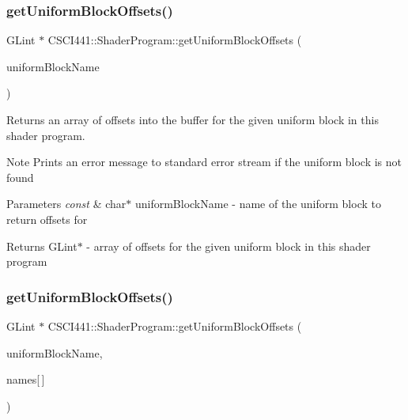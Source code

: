 \subsubsection{\texorpdfstring{get\+Uniform\+Block\+Offsets()}{getUniformBlockOffsets()}\hspace{0.1cm}{\footnotesize\ttfamily [1/2]}}
{\footnotesize\ttfamily G\+Lint $\ast$ C\+S\+C\+I441\+::\+Shader\+Program\+::get\+Uniform\+Block\+Offsets (\begin{DoxyParamCaption}\item[{const char $\ast$}]{uniform\+Block\+Name }\end{DoxyParamCaption})}



Returns an array of offsets into the buffer for the given uniform block in this shader program. 

\begin{DoxyNote}{Note}
Prints an error message to standard error stream if the uniform block is not found 
\end{DoxyNote}

\begin{DoxyParams}{Parameters}
{\em const} & char$\ast$ uniform\+Block\+Name -\/ name of the uniform block to return offsets for \\
\hline
\end{DoxyParams}
\begin{DoxyReturn}{Returns}
G\+Lint$\ast$ -\/ array of offsets for the given uniform block in this shader program 
\end{DoxyReturn}
\mbox{\label{class_c_s_c_i441_1_1_shader_program_aeebfe8124ca9d60896e1443e9eded2b6}} 
\subsubsection{\texorpdfstring{get\+Uniform\+Block\+Offsets()}{getUniformBlockOffsets()}\hspace{0.1cm}{\footnotesize\ttfamily [2/2]}}
{\footnotesize\ttfamily G\+Lint $\ast$ C\+S\+C\+I441\+::\+Shader\+Program\+::get\+Uniform\+Block\+Offsets (\begin{DoxyParamCaption}\item[{const char $\ast$}]{uniform\+Block\+Name,  }\item[{const char $\ast$}]{names\mbox{[}$\,$\mbox{]} }\end{DoxyParamCaption})}



